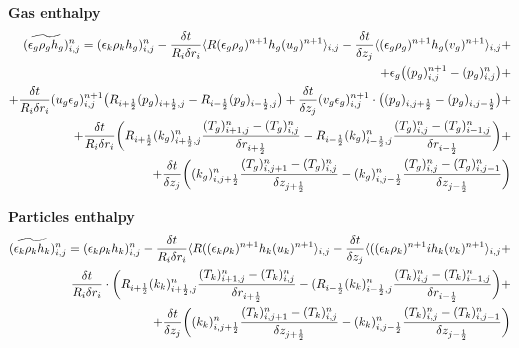 {\bf Gas enthalpy}\\
%
\begin{eqnarray}
\htmlimage{}
(\widetilde{\epsilon_g \rho_g h_g})^n_{i,j} = 
(\epsilon_k \rho_k h_g)_{i,j}^{n} -
\frac {\delta t}{R_i \delta r_{i}} 
\langle R (\epsilon_g \rho_g)^{n+1} h_g (u_g)^{n+1} \rangle_{i,j} -
\frac {\delta t}{\delta z_{j}} 
\langle (\epsilon_g \rho_g)^{n+1} h_g (v_g)^{n+1} \rangle_{i,j} + \nonumber \\
+ \epsilon_g \big ((p_g)_{i,j}^{n+1} - (p_g)_{i,j}^{n} \big )+\nonumber \\
+ \frac {\delta t} {R_i \delta r_i} (u_g \epsilon_g)_{i,j}^{n+1}
\big( R_{i+\frac{1}{2}} (p_g)_{i+\frac{1}{2},j} - 
R_{i-\frac{1}{2}} (p_g)_{i-\frac{1}{2},j} \big)
+ \frac{\delta t}{\delta z_j} (v_g \epsilon_g)_{i,j}^{n+1}
\cdot \big( (p_g)_{i,j+\frac{1}{2}} - (p_g)_{i,j-\frac{1}{2}} \big)+\nonumber \\
+ \frac {\delta t} {R_i \delta r_i} \bigg( R_{i+\frac{1}{2}} 
(k_g)_{i+\frac{1}{2},j}^{n} 
\frac{(T_g)_{i+1,j}^{n} - (T_g)_{i,j}^{n}}{\delta r_{i+\frac{1}{2}}} 
- R_{i-\frac{1}{2}} (k_g)_{i-\frac{1}{2},j}^{n} 
\frac{(T_g)_{i,j}^{n} - (T_g)_{i-1,j}^{n}}{\delta r_{i-\frac{1}{2}}} \bigg)+ \nonumber \\
+ \frac {\delta t} {\delta z_j} \bigg( (k_g)_{i,j+\frac{1}{2}}^{n} 
\frac{(T_g)_{i,j+1}^{n} - (T_g)_{i,j}^{n}}{\delta z_{j+\frac{1}{2}}} - 
(k_g)_{i,j-\frac{1}{2}}^{n} \frac{(T_g)_{i,j}^{n} - 
(T_g)_{i,j-1}^{n}}{\delta z_{j-\frac{1}{2}}} \bigg)
\nonumber
\end{eqnarray}

{\bf Particles enthalpy}\\
%
\begin{eqnarray}
\htmlimage{}
(\widetilde{\epsilon_k \rho_k h_k})^n_{i,j} = 
(\epsilon_k \rho_k h_k)_{i,j}^{n} -
\frac {\delta t}{R_i \delta r_{i}}
\langle R ((\epsilon_k \rho_k)^{n+1} h_k (u_k)^{n+1} \rangle_{i,j}-
\frac {\delta t}{\delta z_{j}}\langle ((\epsilon_k \rho_k)^{n+1} i
h_k (v_k)^{n+1} \rangle_{i,j} +\nonumber \\
\frac {\delta t} {R_i \delta r_i}
\cdot \bigg( R_{i+\frac{1}{2}} (k_k)_{i+\frac{1}{2},j}^{n} 
\frac{(T_k)_{i+1,j}^{n} - (T_k)_{i,j}^{n}}{\delta r_{i+\frac{1}{2}}} - 
( R_{i-\frac{1}{2}} (k_k)_{i-\frac{1}{2},j}^{n} 
\frac{(T_k)_{i,j}^{n} - (T_k)_{i-1,j}^{n}}{\delta r_{i-\frac{1}{2}}} \bigg) + \nonumber \\
+ \frac {\delta t} {\delta z_j} \bigg( (k_k)_{i,j+\frac{1}{2}}^{n} 
\frac{(T_k)_{i,j+1}^{n} - (T_k)_{i,j}^{n}}{\delta z_{j+\frac{1}{2}}} - 
(k_k)_{i,j-\frac{1}{2}}^{n} \frac{(T_k)_{i,j}^{n} - 
(T_k)_{i,j-1}^{n}}{\delta z_{j-\frac{1}{2}}} \bigg)
\nonumber
\end{eqnarray}
\newpage
%
